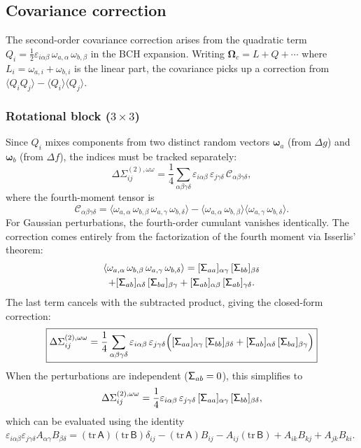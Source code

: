 \documentclass[journal]{IEEEtran}
\newcommand{\bfomega}{\boldsymbol{\omega}}
\newcommand{\bfOmega}{\boldsymbol{\Omega}}
\newcommand{\sfSigma}[1]{\mathsf{\Sigma}_\mathnormal{#1}}
\newcommand{\beq}{\begin{equation}}
\newcommand{\eeq}{\end{equation}}
\begin{document}
\subsection{Covariance correction}

The second-order covariance correction arises from the 
quadratic term $Q_i = \frac{1}{2}\varepsilon_{i\alpha\beta}\,
\omega_{a,\alpha}\,\omega_{b,\beta}$ in the BCH expansion.
Writing $\bfOmega_c = L + Q + \cdots$ where 
$L_i = \omega_{a,i} + \omega_{b,i}$ is the linear part, 
the covariance picks up a correction from 
$\langle Q_i Q_j \rangle - \langle Q_i \rangle \langle Q_j \rangle$.

\subsubsection{Rotational block ($3\times 3$)}
Since $Q_i$ mixes components from two distinct random 
vectors $\bfomega_a$ (from $\Delta g$) and $\bfomega_b$ 
(from $\Delta f$), the indices must be tracked separately:
\beq
    \Delta\Sigma^{(2),\omega\omega}_{ij} = \frac{1}{4}
    \sum_{\alpha\beta\gamma\delta}
    \varepsilon_{i\alpha\beta}\,\varepsilon_{j\gamma\delta}\,
    \mathcal{C}_{\alpha\beta\gamma\delta},
    \label{eq:covcorrection_rotrot}
\eeq
where the fourth-moment tensor is
\beq
    \mathcal{C}_{\alpha\beta\gamma\delta} = 
    \langle \omega_{a,\alpha}\,\omega_{b,\beta}\,
    \omega_{a,\gamma}\,\omega_{b,\delta} \rangle
    - \langle \omega_{a,\alpha}\,\omega_{b,\beta} \rangle
    \langle \omega_{a,\gamma}\,\omega_{b,\delta} \rangle.
\eeq
For Gaussian perturbations, the fourth-order cumulant 
vanishes identically. The correction comes entirely from 
the factorization of the fourth moment via Isserlis' theorem:
\begin{multline}
    \langle \omega_{a,\alpha}\,\omega_{b,\beta}\,
    \omega_{a,\gamma}\,\omega_{b,\delta} \rangle = 
    [\sfSigma{aa}]_{\alpha\gamma}\,[\sfSigma{bb}]_{\beta\delta} \\
    + [\sfSigma{ab}]_{\alpha\delta}\,[\sfSigma{ba}]_{\beta\gamma}
    + [\sfSigma{ab}]_{\alpha\beta}\,[\sfSigma{ab}]_{\gamma\delta}.
    \label{eq:isserlis}
\end{multline}
The last term cancels with the subtracted product, giving 
the closed-form correction:
\beq
    \boxed{
    \Delta\Sigma^{(2),\omega\omega}_{ij} = \frac{1}{4}
    \sum_{\alpha\beta\gamma\delta}
    \varepsilon_{i\alpha\beta}\,\varepsilon_{j\gamma\delta}
    \Big([\sfSigma{aa}]_{\alpha\gamma}\,[\sfSigma{bb}]_{\beta\delta}
    + [\sfSigma{ab}]_{\alpha\delta}\,[\sfSigma{ba}]_{\beta\gamma}\Big)
    }
    \label{eq:covcorrection_explicit}
\eeq
When the perturbations are independent ($\sfSigma{ab} = 0$), 
this simplifies to
\beq
    \Delta\Sigma^{(2),\omega\omega}_{ij} = \frac{1}{4}
    \varepsilon_{i\alpha\beta}\,\varepsilon_{j\gamma\delta}\,
    [\sfSigma{aa}]_{\alpha\gamma}\,[\sfSigma{bb}]_{\beta\delta},
\eeq
which can be evaluated using the identity 
$\varepsilon_{i\alpha\beta}\varepsilon_{j\gamma\delta}
A_{\alpha\gamma}B_{\beta\delta} = 
(\mathrm{tr}\,\mathsf{A})(\mathrm{tr}\,\mathsf{B})\delta_{ij}
- (\mathrm{tr}\,\mathsf{A})B_{ij} - A_{ij}(\mathrm{tr}\,\mathsf{B})
+ A_{ik}B_{kj} + A_{jk}B_{ki}$.
\end{document}

